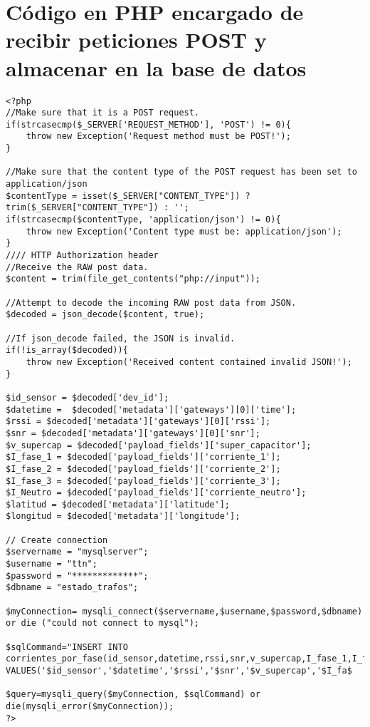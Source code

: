 
\chapter{C\'{o}digo en PHP encargado de recibir peticiones POST y almacenar en la base de datos} %

\label{Appendix_PHP_code} %

\lstset{language=php}
\begin{lstlisting}[label=codigo_php,caption=Codigo PHP encargado de recibir peticiones POST desde \textit{The Things Network}.]
<?php
//Make sure that it is a POST request.
if(strcasecmp($_SERVER['REQUEST_METHOD'], 'POST') != 0){
	throw new Exception('Request method must be POST!');
}

//Make sure that the content type of the POST request has been set to application/json
$contentType = isset($_SERVER["CONTENT_TYPE"]) ? trim($_SERVER["CONTENT_TYPE"]) : '';
if(strcasecmp($contentType, 'application/json') != 0){
	throw new Exception('Content type must be: application/json');
}
//// HTTP Authorization header
//Receive the RAW post data.
$content = trim(file_get_contents("php://input"));

//Attempt to decode the incoming RAW post data from JSON.
$decoded = json_decode($content, true);

//If json_decode failed, the JSON is invalid.
if(!is_array($decoded)){
	throw new Exception('Received content contained invalid JSON!');
}

$id_sensor = $decoded['dev_id'];
$datetime =  $decoded['metadata']['gateways'][0]['time'];
$rssi = $decoded['metadata']['gateways'][0]['rssi'];
$snr = $decoded['metadata']['gateways'][0]['snr'];
$v_supercap = $decoded['payload_fields']['super_capacitor'];
$I_fase_1 = $decoded['payload_fields']['corriente_1'];
$I_fase_2 = $decoded['payload_fields']['corriente_2'];
$I_fase_3 = $decoded['payload_fields']['corriente_3'];
$I_Neutro = $decoded['payload_fields']['corriente_neutro'];
$latitud = $decoded['metadata']['latitude'];
$longitud = $decoded['metadata']['longitude'];

// Create connection
$servername = "mysqlserver";
$username = "ttn";
$password = "*************";
$dbname = "estado_trafos";

$myConnection= mysqli_connect($servername,$username,$password,$dbname) or die ("could not connect to mysql");

$sqlCommand="INSERT INTO corrientes_por_fase(id_sensor,datetime,rssi,snr,v_supercap,I_fase_1,I_fase_2,I_fase_3,I_Neutro,latitud,longitud) VALUES('$id_sensor','$datetime','$rssi','$snr','$v_supercap','$I_fa$

$query=mysqli_query($myConnection, $sqlCommand) or die(mysqli_error($myConnection));
?>

\end{lstlisting}